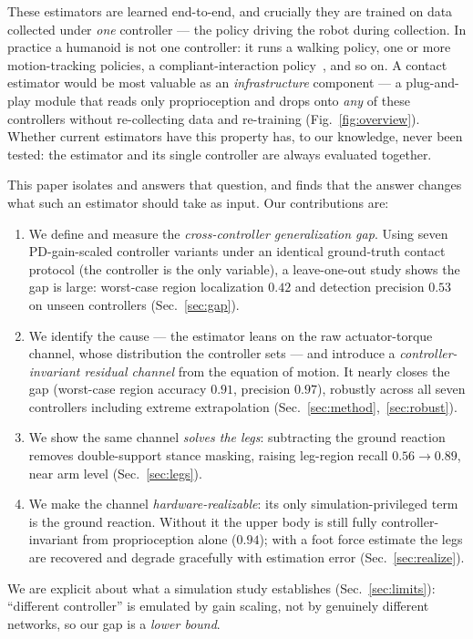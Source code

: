 \documentclass[conference]{IEEEtran}
\begin{document}
These estimators are learned end-to-end, and crucially they are trained on data
collected under \emph{one} controller --- the policy driving the robot during
collection. In practice a humanoid is not one controller: it runs a walking
policy, one or more motion-tracking policies, a compliant-interaction
policy~\cite{gentlehumanoid}, and so on. A contact estimator would be most
valuable as an \emph{infrastructure} component --- a plug-and-play module that
reads only proprioception and drops onto \emph{any} of these controllers without
re-collecting data and re-training (Fig.~\ref{fig:overview}). Whether current
estimators have this property
has, to our knowledge, never been tested: the estimator and its single controller
are always evaluated together.

This paper isolates and answers that question, and finds that the answer changes
what such an estimator should take as input. Our contributions are:
\begin{enumerate}
\item We define and measure the \emph{cross-controller generalization gap}. Using
seven PD-gain-scaled controller variants under an identical ground-truth contact
protocol (the controller is the only variable), a leave-one-out study shows the
gap is large: worst-case region localization $0.42$ and detection precision
$0.53$ on unseen controllers (Sec.~\ref{sec:gap}).
\item We identify the cause --- the estimator leans on the raw actuator-torque
channel, whose distribution the controller sets --- and introduce a
\emph{controller-invariant residual channel} from the equation of motion. It
nearly closes the gap (worst-case region accuracy $0.91$, precision $0.97$),
robustly across all seven controllers including extreme extrapolation
(Sec.~\ref{sec:method},~\ref{sec:robust}).
\item We show the same channel \emph{solves the legs}: subtracting the ground
reaction removes double-support stance masking, raising leg-region recall
$0.56\!\to\!0.89$, near arm level (Sec.~\ref{sec:legs}).
\item We make the channel \emph{hardware-realizable}: its only
simulation-privileged term is the ground reaction. Without it the upper body is
still fully controller-invariant from proprioception alone ($0.94$); with a foot
force estimate the legs are recovered and degrade gracefully with estimation
error (Sec.~\ref{sec:realize}).
\end{enumerate}
We are explicit about what a simulation study establishes
(Sec.~\ref{sec:limits}): ``different controller'' is emulated by gain scaling, not
by genuinely different networks, so our gap is a \emph{lower bound}.
\end{document}
